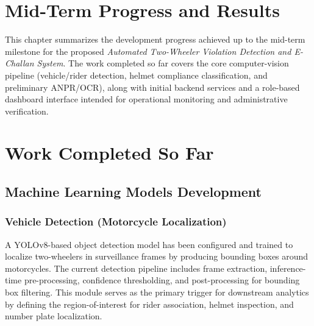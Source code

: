 \providecommand{\chapter}[1]{\section{#1}}
\chapter{Mid-Term Progress and Results}
\label{ch:mid-term-progress}

This chapter summarizes the development progress achieved up to the mid-term milestone for the proposed \textit{Automated Two-Wheeler Violation Detection and E-Challan System}. The work completed so far covers the core computer-vision pipeline (vehicle/rider detection, helmet compliance classification, and preliminary ANPR/OCR), along with initial backend services and a role-based dashboard interface intended for operational monitoring and administrative verification.

\section{Work Completed So Far}
\label{sec:work-completed}

\subsection{Machine Learning Models Development}
\label{subsec:ml-models-development}

\subsubsection{Vehicle Detection (Motorcycle Localization)}
A YOLOv8-based object detection model has been configured and trained to localize two-wheelers in surveillance frames by producing bounding boxes around motorcycles. The current detection pipeline includes frame extraction, inference-time pre-processing, confidence thresholding, and post-processing for bounding box filtering. This module serves as the primary trigger for downstream analytics by defining the region-of-interest for rider association, helmet inspection, and number plate localization.

